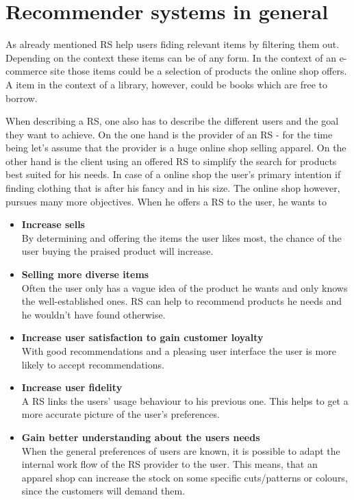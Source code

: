 

\section{Recommender systems in general}
As already mentioned RS help users fiding relevant items by filtering them out.
Depending on the context these items can be of any form.
In the context of an e-commerce site those items could be a selection of products the online shop offers.
A item in the context of a library, however, could be books which are free to borrow.
\citep[p.~377-378]{burke:2007}

When describing a RS, one also has to describe the different users and the goal they want to achieve.
On the one hand is the provider of an RS - for the time being let's assume that the provider is a huge online shop selling apparel.
On the other hand is the client using an offered RS to simplify the search for products best suited for his needs.
In case of a online shop the user's primary intention if finding clothing that is after his fancy and in his size.
The online shop however, pursues many more objectives.
When he offers a RS to the user, he wants to
\begin{itemize}
    \item\textbf{Increase sells}\hfill\\
        By determining and offering the items the user likes most, the chance of the user buying the praised product will increase.
    \item\textbf{Selling more diverse items}\hfill\\
        Often the user only has a vague idea of the product he wants and only knows the well-established ones.
        RS can help to recommend products he needs and he wouldn't have found otherwise.
    \item\textbf{Increase user satisfaction to gain customer loyalty}\hfill\\
        With good recommendations and a pleasing user interface the user is more likely to accept recommendations.
    \item\textbf{Increase user fidelity}\hfill\\
        A RS links the users' usage behaviour to his previous one.
        This helps to get a more accurate picture of the user's preferences.
    \item\textbf{Gain better understanding about the users needs}\hfill\\
        When the general preferences of users are known, it is possible to adapt the internal work flow of the RS provider to the user.
        This means, that an apparel shop can increase the stock on some specific cuts/patterns or colours, since the customers will demand them.
\end{itemize}
